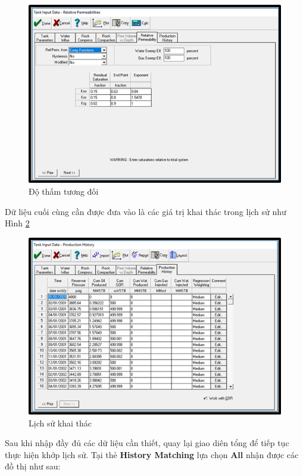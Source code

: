 \documentclass[12pt,a4paper]{report}
\begin{document}
		\begin{figure}[h]
        	\centering
            \includegraphics[scale=1]{Fig/rel_perm.png}
            \caption{Độ thấm tương đối}
            \label{fig:rel_perm}
        \end{figure}
        \clearpage
        \noindent
Dữ liệu cuối cùng cần được đưa vào là các giá trị khai thác trong lịch sử như Hình \ref{fig:pro_history}
		\begin{figure}[h]
        	\centering
            \includegraphics[scale=1]{Fig/Pro_history.png}
            \caption{Lịch sử khai thác}
            \label{fig:pro_history}
        \end{figure}
		\clearpage
        \noindent
Sau khi nhập đầy đủ các dữ liệu cần thiết, quay lại giao diên tổng để tiếp tục thực hiện khớp lịch sử. Tại thẻ \textbf{History Matching} lựa chọn \textbf{All} nhận được các đồ thị như sau:
\end{document}
